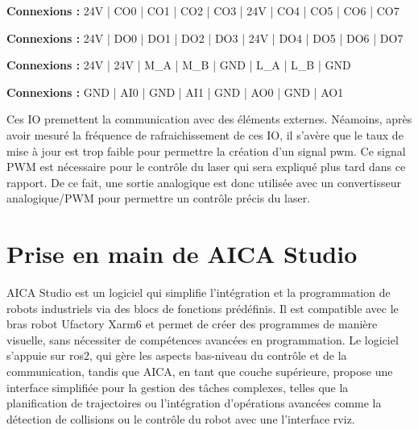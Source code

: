 \begin{tcolorbox}[colframe=black, colback=ConfigOutputColor, title=Configurable Outputs]
\textbf{Connexions :} 24V | CO0 | CO1 | CO2 | CO3 | 24V | CO4 | CO5 | CO6 | CO7
\end{tcolorbox}

\begin{tcolorbox}[colframe=black, colback=DigitalOutputColor, title=Digital Outputs]
\textbf{Connexions :} 24V | DO0 | DO1 | DO2 | DO3 | 24V | DO4 | DO5 | DO6 | DO7
\end{tcolorbox}

\begin{tcolorbox}[colframe=black, colback=RS485Color, title=RS485]
\textbf{Connexions :} 24V | 24V | M\_A | M\_B | GND | L\_A | L\_B | GND
\end{tcolorbox}

\begin{tcolorbox}[colframe=black, colback=AnalogColor, title=Analog]
\textbf{Connexions :} GND | AI0 | GND | AI1 | GND | AO0 | GND | AO1
\end{tcolorbox}

Ces IO premettent la communication avec des éléments externes. Néamoins, après avoir mesuré la fréquence de rafraichissement de ces IO, il s'avère que le taux de mise à jour est trop faible pour permettre la création d'un signal \gls{pwm}. Ce signal PWM est nécessaire pour le contrôle du laser qui sera expliqué plus tard dans ce rapport. De ce fait, une sortie analogique est donc utilisée avec un convertisseur analogique/PWM pour permettre un contrôle précis du laser.

\section{Prise en main de AICA Studio}
AICA Studio est un logiciel qui simplifie l'intégration et la programmation de robots industriels via des blocs de fonctions prédéfinis. Il est compatible avec le bras robot Ufactory Xarm6 et permet de créer des programmes de manière visuelle, sans nécessiter de compétences avancées en programmation. Le logiciel s'appuie sur \gls{ros2}, qui gère les aspects bas-niveau du contrôle et de la communication, tandis que AICA, en tant que couche supérieure, propose une interface simplifiée pour la gestion des tâches complexes, telles que la planification de trajectoires ou l'intégration d'opérations avancées comme la détection de collisions ou le contrôle du robot avec une l'interface \gls{rviz}.

